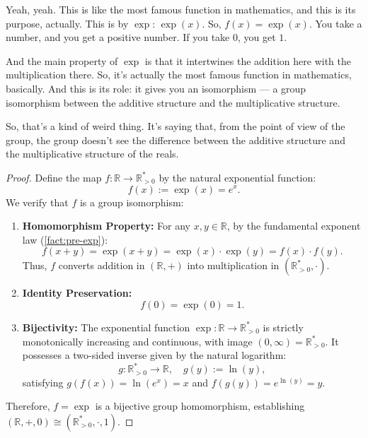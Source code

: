 \begin{speech}[00:18:32 - 00:19:27]
Yeah, yeah. This is like the most famous function in mathematics, and this is its purpose, actually. This is by $\exp$:  $\exp(x)$. So, $f(x) = \exp(x)$.  You take a number, and you get a positive number. If you take $0$, you get $1$.

And the main property of $\exp$ is that it intertwines the addition here with the multiplication there. So, it's actually the most famous function in mathematics, basically. And this is its role: it gives you an isomorphism --- a group isomorphism between the additive structure and the multiplicative structure.

So, that's a kind of weird thing. It's saying that, from the point of view of the group, the group doesn't see the difference between the additive structure and the multiplicative structure of the reals.
\end{speech}

\begin{content}

\begin{proof}
Define the map $f \colon \mathbb{R} \to \mathbb{R}^*_{>0}$ by the natural exponential function:
\[
f(x) := \exp(x) = e^x.
\]
We verify that $f$ is a group isomorphism:
\begin{enumerate}[label=\textbf{(\roman*)}]
    \item \textbf{Homomorphism Property:} For any $x, y \in \mathbb{R}$, by the fundamental exponent law (\cref{fact:pre-exp}):
    \[
    f(x + y) = \exp(x + y) = \exp(x) \cdot \exp(y) = f(x) \cdot f(y).
    \]
    Thus, $f$ converts addition in $(\mathbb{R}, +)$ into multiplication in $(\mathbb{R}^*_{>0}, \cdot)$.
    \item \textbf{Identity Preservation:}
    \[
    f(0) = \exp(0) = 1.
    \]
    \item \textbf{Bijectivity:} The exponential function $\exp \colon \mathbb{R} \to \mathbb{R}^*_{>0}$ is strictly monotonically increasing and continuous, with image $(0, \infty) = \mathbb{R}^*_{>0}$. It possesses a two-sided inverse given by the natural logarithm:
    \[
    g \colon \mathbb{R}^*_{>0} \to \mathbb{R}, \quad g(y) := \ln(y),
    \]
    satisfying $g(f(x)) = \ln(e^x) = x$ and $f(g(y)) = e^{\ln(y)} = y$.
\end{enumerate}
Therefore, $f = \exp$ is a bijective group homomorphism, establishing $(\mathbb{R}, +, 0) \cong (\mathbb{R}^*_{>0}, \cdot, 1)$.
\end{proof}
\end{content}


